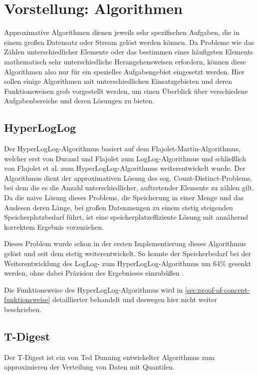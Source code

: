 \section{Vorstellung: Algorithmen}

Approximative Algorithmen dienen jeweils sehr spezifischen Aufgaben, die in einem großen Datensatz oder Stream gelöst werden können.
Da Probleme wie das Zählen unterschiedlicher Elemente oder das bestimmen eines häufigsten Elements mathematisch sehr unterschiedliche Herangehensweisen erfordern, können diese Algorithmen also nur für ein spezielles Aufgabengebiet eingesetzt werden.
Hier sollen einige Algorithmen mit unterschiedlichen Einsatzgebieten und deren Funktionsweisen grob vorgestellt werden, um einen Überblick über verschiedene Aufgabenbereiche und deren Lösungen zu bieten.

\subsection{HyperLogLog}

Der HyperLogLog-Algorithmus basiert auf dem Flajolet-Martin-Algorithmus, welcher erst von Durand und Flajolet \cite{durand2003} zum LogLog-Algorithmus und schließlich von Flajolet et al. \cite{flajolet2007} zum HyperLogLog-Algorithmus weiterentwickelt wurde.
Der Algorithmus dient der approximativen Lösung des sog. Count-Distinct-Problems, bei dem die es die Anzahl unterschiedlicher, auftretender Elemente zu zählen gilt.
Da die naive Lösung dieses Problems, die Speicherung in einer Menge und das Auslesen deren Länge, bei großen Datenmengen zu einem stetig steigenden Speicherplatzbedarf führt, ist eine speicherplatzeffiziente Lösung mit annähernd korrektem Ergebnis vorzuziehen.

Dieses Problem wurde schon in der ersten Implementierung dieses Algorithmus gelöst und seit dem stetig weiterentwickelt.
So konnte der Speicherbedarf bei der Weiterentwicklung des LogLog- zum HyperLogLog-Algorithmus um 64\% gesenkt werden, ohne dabei Präzision des Ergebnisses einzubüßen \cite{flajolet2007}.

Die Funktionsweise des HyperLogLog-Algorithmus wird in \autoref{sec:proof-of-concept-funktionsweise} detaillierter behandelt und deswegen hier nicht weiter beschrieben.

\subsection{T-Digest}

Der T-Digest ist ein von Ted Dunning entwickelter Algorithmus zum approximieren der Verteilung von Daten mit Quantilen.

